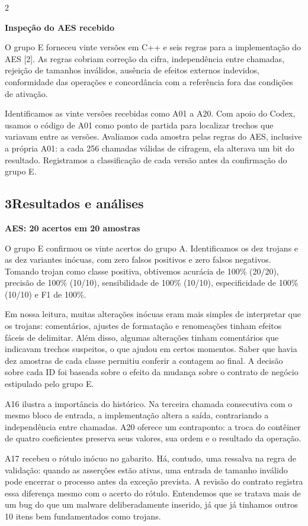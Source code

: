 \documentclass[10pt,a4paper]{article}
\newcommand{\secao}[1]{\subsection*{#1}}
\newcommand{\tema}[1]{\par\medskip\noindent\textbf{#1}\par}
\begin{document}
\begin{multicols}{2}
\tema{Inspeção do AES recebido}
O grupo E forneceu vinte versões em C++ e seis regras para a implementação do AES [2]. As regras cobriam correção da cifra, independência entre chamadas, rejeição de tamanhos inválidos, ausência de efeitos externos indevidos, conformidade das operações e concordância com a referência fora das condições de ativação.

Identificamos as vinte versões recebidas como A01 a A20. Com apoio do Codex, usamos o código de A01 como ponto de partida para localizar trechos que variavam entre as versões. Avaliamos cada amostra pelas regras do AES, inclusive a própria A01: a cada 256 chamadas válidas de cifragem, ela alterava um bit do resultado. Registramos a classificação de cada versão antes da confirmação do grupo E.

\secao{3\quad Resultados e análises}
\tema{AES: 20 acertos em 20 amostras}
O grupo E confirmou os vinte acertos do grupo A. Identificamos os dez trojans e as dez variantes inócuas, com zero falsos positivos e zero falsos negativos. Tomando trojan como classe positiva, obtivemos acurácia de 100\% (20/20), precisão de 100\% (10/10), sensibilidade de 100\% (10/10), especificidade de 100\% (10/10) e F1 de 100\%.

Em nossa leitura, muitas alterações inócuas eram mais simples de interpretar que os trojans: comentários, ajustes de formatação e renomeações tinham efeitos fáceis de delimitar. Além disso, algumas alterações tinham comentários que indicavam trechos suspeitos, o que ajudou em certos momentos. Saber que havia dez amostras de cada classe permitiu conferir a contagem ao final. A decisão sobre cada ID foi baseada sobre o efeito da mudança sobre o contrato de negócio estipulado pelo grupo E.

A16 ilustra a importância do histórico. Na terceira chamada consecutiva com o mesmo bloco de entrada, a implementação altera a saída, contrariando a independência entre chamadas. A20 oferece um contraponto: a troca do contêiner de quatro coeficientes preserva seus valores, sua ordem e o resultado da operação.

A17 recebeu o rótulo inócuo no gabarito. Há, contudo, uma ressalva na regra de validação: quando as asserções estão ativas, uma entrada de tamanho inválido pode encerrar o processo antes da exceção prevista. A revisão do contrato registra essa diferença mesmo com o acerto do rótulo. Entendemos que se tratava mais de um bug do que um malware deliberadamente inserido, já que já tinhamos outros 10 itens bem fundamentados como trojans.
\end{multicols}
\end{document}
